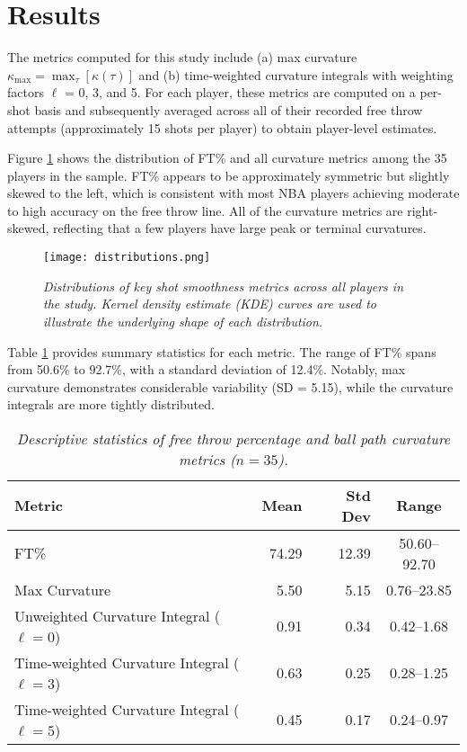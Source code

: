 \documentclass{article}
\begin{document}
\section{Results}
    
    The metrics computed for this study include (a) max curvature $\kappa_{\max} = \max_\tau[\kappa(\tau)]$ and (b) time-weighted curvature integrals with weighting factors $\ell$ = 0, 3, and 5. For each player, these metrics are computed on a per-shot basis and subsequently averaged across all of their recorded free throw attempts (approximately 15 shots per player) to obtain player-level estimates.

    Figure \ref{fig:scattered} shows the distribution of FT\% and all curvature metrics among the 35 players in the sample. FT\% appears to be approximately symmetric but slightly skewed to the left, which is consistent with most NBA players achieving moderate to high accuracy on the free throw line. All of the curvature metrics are right-skewed, reflecting that a few players have large peak or terminal curvatures.

    \begin{figure}[H]
        \centering
        \texttt{[image: distributions.png]}
        \caption{\it Distributions of key shot smoothness metrics across all players in the study. Kernel density estimate (KDE) curves are used to illustrate the underlying shape of each distribution.}
        \label{fig:scattered}
    \end{figure}
    
    Table \ref{tab:summary-stats} provides summary statistics for each metric. The range of FT\% spans from 50.6\% to 92.7\%, with a standard deviation of 12.4\%. Notably, max curvature demonstrates considerable variability (SD = 5.15), while the curvature integrals are more tightly distributed.

    \begin{table}[H]
        \centering
        \begin{tabular}{lrrc}
        \toprule
        \textbf{Metric} & \textbf{Mean} & \textbf{Std Dev} & \textbf{Range} \\
        \midrule
        FT\% & 74.29 & 12.39 & 50.60--92.70 \\
        Max Curvature & 5.50 & 5.15 & 0.76--23.85 \\
        Unweighted Curvature Integral ($\ell=0$) & 0.91 & 0.34 & 0.42--1.68 \\
        Time-weighted Curvature Integral ($\ell=3$) & 0.63 & 0.25 & 0.28--1.25 \\
        Time-weighted Curvature Integral ($\ell=5$) & 0.45 & 0.17 & 0.24--0.97 \\
        \bottomrule
        \end{tabular}
        \caption{\it Descriptive statistics of free throw percentage and ball path curvature metrics ($n = 35$).}
        \label{tab:summary-stats}
    \end{table}
\end{document}
